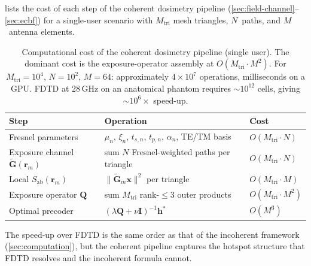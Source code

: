 \documentclass[11pt,a4paper]{article}
\theoremstyle{definition}      %
\begin{document}
 lists the cost of each step of the
coherent dosimetry pipeline (\cref{sec:field-channel}--\cref{sec:ecbf})
for a single-user scenario with $M_\mathrm{tri}$ mesh triangles,
$N$~paths, and $M$~antenna elements.

\begin{table}[!htbp]
\centering
\caption{Computational cost of the coherent dosimetry pipeline
  (single user).  The dominant cost is the exposure-operator assembly
  at $O(M_\mathrm{tri}\!\cdot\! M^2)$.  For $M_\mathrm{tri}=10^4$,
  $N=10^2$, $M=64$: approximately $4\times 10^7$ operations,
  milliseconds on a GPU.  FDTD at 28\,GHz on an anatomical phantom
  requires $\sim\!10^{12}$ cells, giving $\sim\!10^6\times$
  speed-up.}\label{tab:coherent-cost}
\begin{tabular}{lll}
\toprule
Step & Operation & Cost \\
\midrule
Fresnel parameters & $\mu_n$, $\xi_n$, $t_{s,n}$, $t_{p,n}$,
  $\alpha_n$, TE/TM basis & $O(M_\mathrm{tri}\!\cdot\! N)$ \\
Exposure channel $\tilde{\mathbf{G}}(\mathbf{r}_m)$ &
  sum $N$ Fresnel-weighted paths per triangle &
  $O(M_\mathrm{tri}\!\cdot\! N)$ \\
Local $S_\mathrm{ab}(\mathbf{r}_m)$ &
  $\|\tilde{\mathbf{G}}_m\mathbf{x}\|^2$ per triangle &
  $O(M_\mathrm{tri}\!\cdot\! M)$ \\
Exposure operator $\mathbf{Q}$ &
  sum $M_\mathrm{tri}$ rank-$\leq$3 outer products &
  $O(M_\mathrm{tri}\!\cdot\! M^2)$ \\
Optimal precoder &
  $(\lambda\mathbf{Q}+\nu\mathbf{I})^{-1}\mathbf{h}^*$ &
  $O(M^3)$ \\
\bottomrule
\end{tabular}
\end{table}

The speed-up over FDTD is the same order as that of the incoherent
framework (\cref{sec:computation}), but the coherent pipeline
captures the hotspot structure that FDTD resolves and the incoherent
formula cannot.
\end{document}
